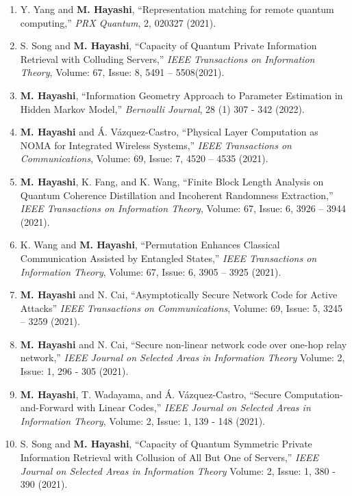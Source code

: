 \documentclass[a4paper,12pt,oneside]{article}
\begin{document}
\begin{enumerate}
\item
Y. Yang and \textbf{M. Hayashi},
``Representation matching for remote quantum computing,''
{\em PRX Quantum},
2, 020327 (2021).

\item
S. Song and \textbf{M. Hayashi},
``Capacity of Quantum Private Information Retrieval with Colluding Servers,''
{\em IEEE Transactions on Information Theory}, 
Volume: 67, Issue: 8, 5491 -- 5508(2021).

\item
\textbf{M. Hayashi},
``Information Geometry Approach to Parameter Estimation in Hidden Markov Model,''
{\em Bernoulli Journal},
28 (1) 307 - 342 (2022).

\item
\textbf{M. Hayashi} and \'{A}. V\'{a}zquez-Castro,
``Physical Layer Computation as NOMA for Integrated Wireless Systems,''
{\em IEEE Transactions on Communications},
Volume: 69, Issue: 7, 4520 -- 4535 (2021).

\item
\textbf{M. Hayashi}, K. Fang, and K. Wang,
``Finite Block Length Analysis on Quantum Coherence Distillation and Incoherent Randomness Extraction,''
{\em IEEE Transactions on Information Theory},
Volume: 67, Issue: 6, 3926 -- 3944 (2021).

\item
K. Wang and \textbf{M. Hayashi},
``Permutation Enhances Classical Communication Assisted by Entangled States,''
{\em IEEE Transactions on Information Theory},
Volume: 67, Issue: 6, 3905 -- 3925 (2021).

\item
\textbf{M. Hayashi} and N. Cai,
``Asymptotically Secure Network Code for Active Attacks''
{\em IEEE Transactions on Communications},
Volume: 69, Issue: 5, 3245 -- 3259 (2021).

\item  
\textbf{M. Hayashi} and N. Cai,
``Secure non-linear network code over one-hop relay network,''
{\em IEEE Journal on Selected Areas in Information Theory}
Volume: 2, Issue: 1, 296 - 305 (2021).

\item  
\textbf{M. Hayashi}, T. Wadayama, and \'{A}. V\'{a}zquez-Castro,
``Secure Computation-and-Forward with Linear Codes,''
{\em IEEE Journal on Selected Areas in Information Theory},
Volume: 2, Issue: 1, 139 - 148 (2021).

\item  
S. Song and \textbf{M. Hayashi},
``Capacity of Quantum Symmetric Private Information Retrieval with Collusion of All But One of Servers,''
{\em IEEE Journal on Selected Areas in Information Theory}
Volume: 2, Issue: 1, 380 - 390 (2021).


\end{enumerate}
\end{document}
